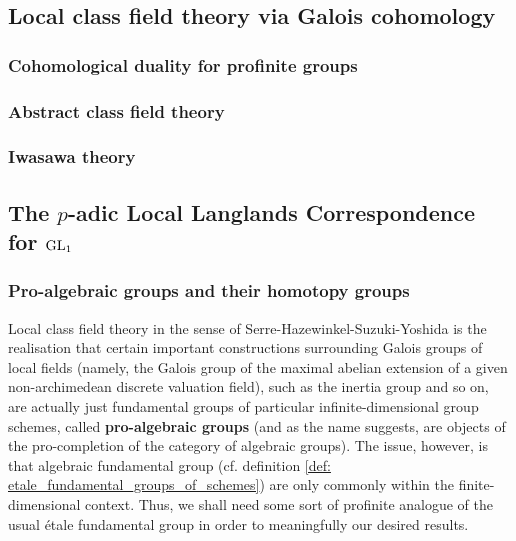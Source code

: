         \subsection{Local class field theory via Galois cohomology}
            \subsubsection{Cohomological duality for profinite groups}
            
            \subsubsection{Abstract class field theory}
            
            \subsubsection{Iwasawa theory}
    
        \subsection{The \texorpdfstring{$p$}{}-adic Local Langlands Correspondence for \texorpdfstring{$\operatorname{GL}_1$}{}}
            \subsubsection{Pro-algebraic groups and their homotopy groups}
                Local class field theory in the sense of Serre-Hazewinkel-Suzuki-Yoshida is the realisation that certain important constructions surrounding Galois groups of local fields (namely, the Galois group of the maximal abelian extension of a given non-archimedean discrete valuation field), such as the inertia group and so on, are actually just fundamental groups of particular infinite-dimensional group schemes, called \textbf{pro-algebraic groups} (and as the name suggests, are objects of the pro-completion of the category of algebraic groups). The issue, however, is that algebraic fundamental group (cf. definition \ref{def: etale_fundamental_groups_of_schemes}) are only commonly within the finite-dimensional context. Thus, we shall need some sort of profinite analogue of the usual \'etale fundamental group in order to meaningfully our desired results.
                
